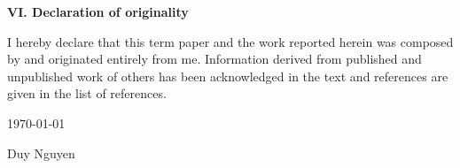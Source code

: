 \thispagestyle{plain}
\textbf{VI. Declaration of originality}

\vspace{6pt}

I hereby declare that this term paper and the work reported herein was composed by and originated entirely from me. Information derived from published and unpublished work of others has been acknowledged in the text and references are given in the list of references. 

\begin{flushright}
	\today

	Duy Nguyen
\end{flushright}
